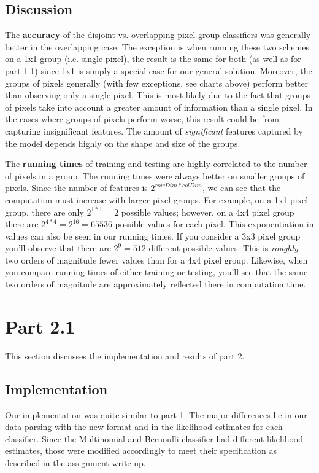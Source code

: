 \documentclass[10pt,a4paper]{article}
\begin{document}
\subsection{Discussion}
The \textbf{accuracy} of the disjoint vs. overlapping pixel group classifiers was generally better in the overlapping case. The exception is when running these two schemes on a 1x1 group (i.e. single pixel), the result is the same for both (as well as for part 1.1) since 1x1 is simply a special case for our general solution. Moreover, the groups of pixels generally (with few exceptions, see charts above) perform better than observing only a single pixel. This is most likely due to the fact that groups of pixels take into account a greater amount of information than a single pixel. In the cases where groups of pixels perform worse, this result could be from capturing insignificant features. The amount of \emph{significant} features captured by the model depends highly on the shape and size of the groups.

The \textbf{running times} of training and testing are highly correlated to the number of pixels in a group. The running times were always better on smaller groups of pixels. Since the number of features is $2^{rowDim*colDim}$, we can see that the computation must increase with larger pixel groups. For example, on a 1x1 pixel group, there are only $2^{1*1} = 2$ possible values; however, on a 4x4 pixel group there are $2^{4*4} = 2^{16} = 65536$ possible values for each pixel. This exponentiation in values can also be seen in our running times. If you consider a 3x3 pixel group you'll observe that there are $2^9 = 512$ different possible values. This is \emph{roughly} two orders of magnitude fewer values than for a 4x4 pixel group. Likewise, when you compare running times of either training or testing, you'll see that the same two orders of magnitude are approximately reflected there in computation time.

\section{Part 2.1}

This section discusses the implementation and results of part 2.

\subsection{Implementation}
Our implementation was quite similar to part 1. The major differences lie in our data parsing with the new format and in the likelihood estimates for each classifier. Since the Multinomial and Bernoulli classifier had different likelihood estimates, those were modified accordingly to meet their specification as described in the assignment write-up.
\end{document}
